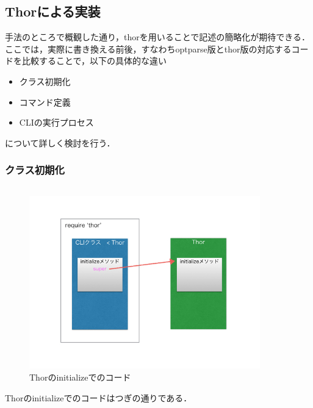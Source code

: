 \subsection{Thorによる実装}
手法のところで概観した通り，thorを用いることで記述の簡略化が期待できる．ここでは，実際に書き換える前後，すなわちoptparse版とthor版の対応するコードを比較することで，以下の具体的な違い

\begin{itemize}
\item クラス初期化
\item コマンド定義
\item CLIの実行プロセス
\end{itemize}
について詳しく検討を行う．

\subsubsection{クラス初期化}\begin{quote}\begin{verbatim}

\end{verbatim}\end{quote}
\begin{figure}[htbp]\begin{center}
\includegraphics[width=10cm,bb= 0 0 737 553]{../figs/./hikiutils_yamane.003.jpg}
\caption{Thorのinitializeでのコード}
\label{default}\end{center}\end{figure}
Thorのinitializeでのコードはつぎの通りである．

